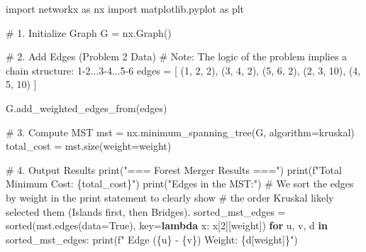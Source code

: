 \documentclass[
  letterpaper,
  DIV=11,
  numbers=noendperiod]{scrreprt}
\newenvironment{Shaded}{\begin{snugshade}}{\end{snugshade}}
\newcommand{\BuiltInTok}[1]{\textcolor[rgb]{0.00,0.23,0.31}{#1}}
\newcommand{\CommentTok}[1]{\textcolor[rgb]{0.37,0.37,0.37}{#1}}
\newcommand{\ControlFlowTok}[1]{\textcolor[rgb]{0.00,0.23,0.31}{\textbf{#1}}}
\newcommand{\DecValTok}[1]{\textcolor[rgb]{0.68,0.00,0.00}{#1}}
\newcommand{\ImportTok}[1]{\textcolor[rgb]{0.00,0.46,0.62}{#1}}
\newcommand{\KeywordTok}[1]{\textcolor[rgb]{0.00,0.23,0.31}{\textbf{#1}}}
\newcommand{\NormalTok}[1]{\textcolor[rgb]{0.00,0.23,0.31}{#1}}
\newcommand{\OperatorTok}[1]{\textcolor[rgb]{0.37,0.37,0.37}{#1}}
\newcommand{\SpecialCharTok}[1]{\textcolor[rgb]{0.37,0.37,0.37}{#1}}
\newcommand{\SpecialStringTok}[1]{\textcolor[rgb]{0.13,0.47,0.30}{#1}}
\newcommand{\StringTok}[1]{\textcolor[rgb]{0.13,0.47,0.30}{#1}}
\newcommand{\VariableTok}[1]{\textcolor[rgb]{0.07,0.07,0.07}{#1}}
\begin{document}
\begin{Shaded}
\begin{Highlighting}[]
\ImportTok{import}\NormalTok{ networkx }\ImportTok{as}\NormalTok{ nx}
\ImportTok{import}\NormalTok{ matplotlib.pyplot }\ImportTok{as}\NormalTok{ plt}

\CommentTok{\# 1. Initialize Graph}
\NormalTok{G }\OperatorTok{=}\NormalTok{ nx.Graph()}

\CommentTok{\# 2. Add Edges (Problem 2 Data)}
\CommentTok{\# Note: The logic of the problem implies a chain structure: 1{-}2...3{-}4...5{-}6}
\NormalTok{edges }\OperatorTok{=}\NormalTok{ [}
\NormalTok{    (}\DecValTok{1}\NormalTok{, }\DecValTok{2}\NormalTok{, }\DecValTok{2}\NormalTok{),}
\NormalTok{    (}\DecValTok{3}\NormalTok{, }\DecValTok{4}\NormalTok{, }\DecValTok{2}\NormalTok{),}
\NormalTok{    (}\DecValTok{5}\NormalTok{, }\DecValTok{6}\NormalTok{, }\DecValTok{2}\NormalTok{),}
\NormalTok{    (}\DecValTok{2}\NormalTok{, }\DecValTok{3}\NormalTok{, }\DecValTok{10}\NormalTok{),}
\NormalTok{    (}\DecValTok{4}\NormalTok{, }\DecValTok{5}\NormalTok{, }\DecValTok{10}\NormalTok{)}
\NormalTok{]}

\NormalTok{G.add\_weighted\_edges\_from(edges)}

\CommentTok{\# 3. Compute MST}
\NormalTok{mst }\OperatorTok{=}\NormalTok{ nx.minimum\_spanning\_tree(G, algorithm}\OperatorTok{=}\StringTok{\textquotesingle{}kruskal\textquotesingle{}}\NormalTok{)}
\NormalTok{total\_cost }\OperatorTok{=}\NormalTok{ mst.size(weight}\OperatorTok{=}\StringTok{\textquotesingle{}weight\textquotesingle{}}\NormalTok{)}

\CommentTok{\# 4. Output Results}
\BuiltInTok{print}\NormalTok{(}\StringTok{"=== Forest Merger Results ==="}\NormalTok{)}
\BuiltInTok{print}\NormalTok{(}\SpecialStringTok{f"Total Minimum Cost: }\SpecialCharTok{\{}\NormalTok{total\_cost}\SpecialCharTok{\}}\SpecialStringTok{"}\NormalTok{)}
\BuiltInTok{print}\NormalTok{(}\StringTok{"Edges in the MST:"}\NormalTok{)}
\CommentTok{\# We sort the edges by weight in the print statement to clearly show }
\CommentTok{\# the order Kruskal likely selected them (Islands first, then Bridges).}
\NormalTok{sorted\_mst\_edges }\OperatorTok{=} \BuiltInTok{sorted}\NormalTok{(mst.edges(data}\OperatorTok{=}\VariableTok{True}\NormalTok{), key}\OperatorTok{=}\KeywordTok{lambda}\NormalTok{ x: x[}\DecValTok{2}\NormalTok{][}\StringTok{\textquotesingle{}weight\textquotesingle{}}\NormalTok{])}
\ControlFlowTok{for}\NormalTok{ u, v, d }\KeywordTok{in}\NormalTok{ sorted\_mst\_edges:}
    \BuiltInTok{print}\NormalTok{(}\SpecialStringTok{f"  Edge (}\SpecialCharTok{\{}\NormalTok{u}\SpecialCharTok{\}}\SpecialStringTok{ {-} }\SpecialCharTok{\{}\NormalTok{v}\SpecialCharTok{\}}\SpecialStringTok{) Weight: }\SpecialCharTok{\{}\NormalTok{d[}\StringTok{\textquotesingle{}weight\textquotesingle{}}\NormalTok{]}\SpecialCharTok{\}}\SpecialStringTok{"}\NormalTok{)}


\end{Highlighting}
\end{Shaded}
\end{document}
